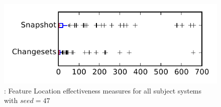 
\begin{figure}
\centering
\includegraphics[height=0.4\textheight]{figures/flt_seed/rq1_tiny_47}
\caption{\rone: Feature Location effectiveness measures for all subject systems with $seed=47$}
\label{fig:flt_seed:rq1:tiny}
\end{figure}
